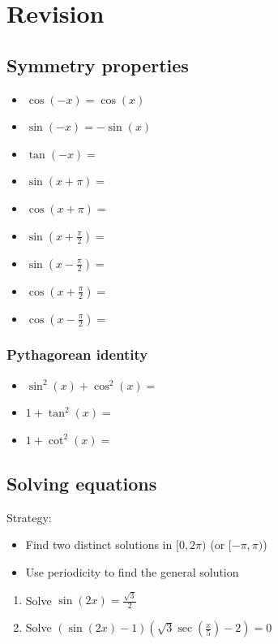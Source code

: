 \documentclass[12pt]{article}
\begin{document}
\section{Revision}
\subsection{Symmetry properties}



\begin{itemize}
    \item $\cos(-x) = \cos(x)$
    \item $\sin(-x) = -\sin(x)$
    \item $\tan(-x) = $
    \item $\sin(x+\pi) =$
    \item $\cos(x+\pi) =$
    \item $\sin(x + \frac{\pi}{2}) =$
    \item $\sin(x - \frac{\pi}{2}) =$
    \item $\cos(x + \frac{\pi}{2}) =$
    \item $\cos(x - \frac{\pi}{2}) =$
\end{itemize}

\subsubsection{Pythagorean identity}
\begin{itemize}
    \item $\sin^2(x) + \cos^2(x) = $
    \item $1 + \tan^2(x) = $
    \item $1 + \cot^2(x) = $
\end{itemize}

\subsection{Solving equations}
Strategy:
\begin{itemize}
    \item Find two distinct solutions in $[0, 2\pi)$ (or $[-\pi, \pi)$)
    \item Use periodicity to find the general solution
\end{itemize}


\begin{enumerate}
    \item Solve $\sin(2x) = \frac{\sqrt{3}}{2}$
    \item Solve $(\sin(2x) - 1)(\sqrt{3}\sec(\frac{x}{5}) - 2) = 0$
\end{enumerate}
\end{document}
